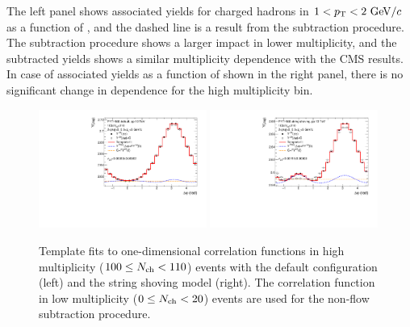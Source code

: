 The left panel shows associated yields for charged hadrons in $1<\mbox{$p_{\mathrm{T}}$}<2~\mathrm{GeV}/c$ as a function of \Nch, and the dashed line is a result from the subtraction procedure.
The subtraction procedure shows a larger impact in lower multiplicity, and the subtracted yields shows a similar multiplicity dependence with the CMS results.
In case of associated yields as a function of \pt shown in the right panel, there is no significant change in \pt dependence for the high multiplicity bin.


\begin{figure}[!h]
\includegraphics[width=0.49\textwidth]{figures/TemplateFit_default.pdf}
\includegraphics[width=0.49\textwidth]{figures/TemplateFit_shoving.pdf}
\caption{Template fits to one-dimensional correlation functions in high multiplicity ($100\leq\mbox{$N_\mathrm{ch}$}<110$) \pythia events with the default configuration (left) and the string shoving model (right). The correlation function in low multiplicity ($0\leq\mbox{$N_\mathrm{ch}$}<20$) events are used for the non-flow subtraction procedure.}
\label{fig:templatefit}
\end{figure}

